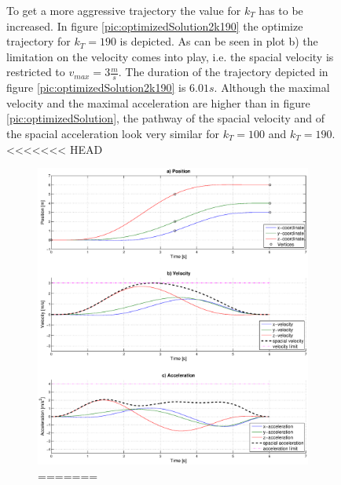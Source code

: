\begin{figure}[h]
To get a more aggressive trajectory the value for $k_T$ has to be increased. In figure \ref{pic:optimizedSolution2k190} the optimize trajectory for $k_T = 190$ is depicted. As can be seen in plot b) the limitation on the velocity comes into play, i.e. the spacial velocity is restricted to $v_{max} = 3 \frac{m}{s}$. The duration of the trajectory depicted in figure \ref{pic:optimizedSolution2k190} is $6.01s$. Although the maximal velocity and the maximal acceleration are higher than in figure \ref{pic:optimizedSolution}, the pathway of the spacial velocity and of the spacial acceleration look very similar for $k_T = 100$ and $k_T = 190$.
<<<<<<< HEAD

\begin{figure}[H]
   \centering
   \includegraphics[trim = 35mm 20mm 30mm 15mm,clip,width=1\textwidth]{pics/2SegOpti6s01k190.eps}
=======
\vspace*{3\baselineskip}


\end{figure}
\end{figure}
